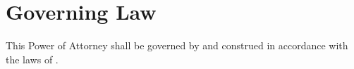 
\section{Governing Law}
\label{sec:jurisdiction}

This Power of Attorney shall be governed by and construed in accordance with the laws of \PoAJurisdiction{}.

